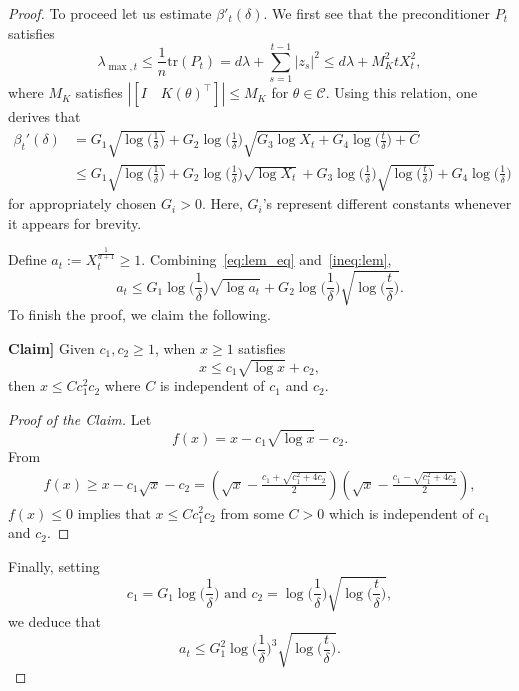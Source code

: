\documentclass[11pt]{article}
\theoremstyle{plain}
\theoremstyle{definition}
\theoremstyle{remark}
\begin{document}
\begin{proof}
To proceed let us estimate $\beta'_t(\delta)$. We first see that the preconditioner $P_t$ satisfies 
\begin{equation}\label{lem7:eq2}
 \lambda_{\max,t} \leq \frac{1}{n}\mathrm{tr}(P_t) = d\lambda+\sum_{s=1}^{t-1} |z_s|^2 \leq d\lambda + M_K^2 t X_t^2,
\end{equation}
where $M_K$ satisfies $|[I \quad K(\theta)^\top ]| \leq M_K$ for $\theta \in \mathcal{C}$. Using this relation, one derives that 
\begin{equation}\label{ineq:lem}
    \begin{split}
    \beta_t'(\delta) 
    &= G_1\sqrt{\log\bigg(\frac{1}{\delta}\bigg)} + G_2\log\bigg(\frac{1}{\delta}\bigg)\sqrt{G_3\log X_t + G_4\log\bigg(\frac{t}{\delta}\bigg)+C}\\
    &\leq G_1\sqrt{\log\bigg(\frac{1}{\delta}\bigg)} + G_2\log\bigg(\frac{1}{\delta}\bigg)\sqrt{\log X_t}+ G_3\log\bigg(\frac{1}{\delta}\bigg)\sqrt{\log\bigg(\frac{t}{\delta}\bigg)}+G_4\log\bigg(\frac{1}{\delta}\bigg)
    \end{split}
\end{equation}
for appropriately chosen $G_i>0$. Here, $G_i$'s represent different constants whenever it appears for brevity.

Define $a_t := X_t^{\frac{1}{d+1}} \geq 1$. Combining~\eqref{eq:lem_eq} and~\eqref{ineq:lem},
\[
a_t \leq  G_1\log\bigg(\frac{1}{\delta}\bigg)\sqrt{\log a_t }+ G_2\log\bigg(\frac{1}{\delta}\bigg)\sqrt{\log\bigg(\frac{t}{\delta}\bigg)}.
\]
To finish the proof, we claim the following.

\textbf{Claim]} Given $c_1,c_2 \geq 1$, when $x \geq 1$ satisfies
\[
x \leq c_1 \sqrt{\log x } +c_2,
\]
then $x\leq C c_1^2 c_2$ where $C$ is independent of $c_1$ and $c_2$.
\begin{proof}[Proof of the Claim]
Let
\[
f(x)=x-c_1\sqrt{\log x} -c_2.
\] 
From 
\begin{align*}
f(x) \geq x-c_1\sqrt{x}-c_2=
(\sqrt{x}-\frac{c_1+\sqrt{c_1^2+4c_2}}{2})(\sqrt{x}-\frac{c_1-\sqrt{c_1^2+4c_2}}{2}),
\end{align*}
$f(x)\leq 0$ implies that $x\leq C c_1^2 c_2$ from some $C>0$ which is independent of $c_1$ and $c_2$.
\end{proof}
Finally, setting
\[
c_1=G_1 \log\bigg(\frac{1}{\delta}\bigg)\text{ and } c_2 = \log\bigg(\frac{1}{\delta}\bigg) \sqrt{\log \bigg(\frac{t}{\delta}\bigg)},
\]
we deduce that  
\[
a_t \leq G_1^2\log\bigg(\frac{1}{\delta}\bigg)^3\sqrt{\log\bigg(\frac{t}{\delta}\bigg)}.
\]
\end{proof}
\end{document}
